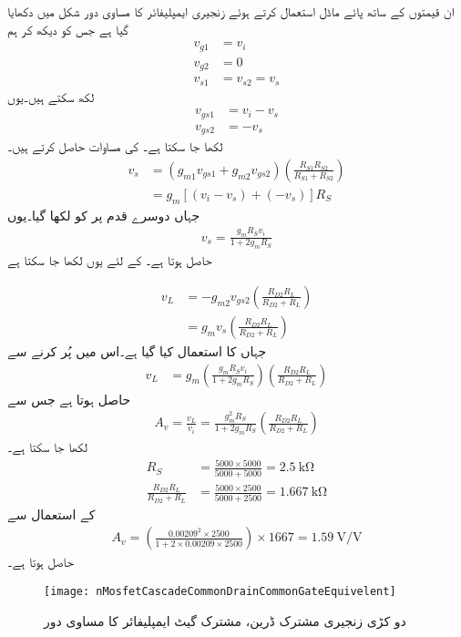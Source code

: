 ان قیمتوں کے ساتھ پائے ماڈل استعمال کرتے ہوئے زنجیری ایمپلیفائر کا مساوی دور شکل  میں دکھایا گیا ہے جس کو دیکھ کر ہم
\begin{align*}
v_{g1}&=v_i\\
v_{g2}&=0\\
v_{s1}&=v_{s2}=v_s
\end{align*}
لکھ سکتے ہیں۔یوں
\begin{align*}
v_{gs1}&=v_i-v_s\\
v_{gs2}&=-v_s
\end{align*}
لکھا جا سکتا ہے۔ کی مساوات حاصل کرتے ہیں۔
\begin{align*}
v_s &=\left(g_{m1} v_{gs1}+g_{m2} v_{gs2} \right) \left(\frac{R_{S1} R_{S2}}{R_{S1}+R_{S2}} \right)\\
&=g_m \left[\left(v_i-v_s \right)+\left(-v_s \right) \right] R_S
\end{align*}
جہاں دوسرے قدم پر  کو  لکھا گیا۔یوں
\begin{align*}
v_s=\frac{g_m R_S v_i}{1+2 g_m R_S}
\end{align*}
حاصل ہوتا ہے۔ کے لئے یوں لکھا جا سکتا ہے

\begin{align*}
v_L&=-g_{m2} v_{gs2} \left(\frac{R_{D2} R_L}{R_{D2}+R_L} \right)\\
&=g_m v_s \left(\frac{R_{D2} R_L}{R_{D2}+R_L} \right)
\end{align*}
جہاں  کا استعمال کیا گیا ہے۔اس میں  پُر کرنے سے
\begin{align*}
v_L&=g_m \left(\frac{g_m R_S v_i}{1+2 g_m R_S}\right) \left(\frac{R_{D2} R_L}{R_{D2}+R_L} \right)
\end{align*}
حاصل ہوتا ہے جس سے
\begin{align*}
A_v=\frac{v_L}{v_i}=\frac{g_m^2 R_S}{1+2 g_m R_S} \left(\frac{R_{D2} R_L}{R_{D2}+R_L} \right)
\end{align*}
لکھا جا سکتا ہے۔
\begin{align*}
R_S&=\frac{5000 \times 5000}{5000+5000}=\SI{2.5}{\kilo \ohm}\\
\frac{R_{D2} R_L}{R_{D2}+R_L}&=\frac{5000 \times 2500}{5000+2500}=\SI{1.667}{\kilo \ohm}
\end{align*}
کے استعمال سے
\begin{align*}
A_v=\left(\frac{0.00209^2 \times 2500}{1+2 \times 0.00209 \times 2500}\right)  \times 1667=\SI{1.59}{\volt \per \volt}
\end{align*}
حاصل ہوتا ہے۔
%
\begin{figure}
\centering
\texttt{[image: nMosfetCascadeCommonDrainCommonGateEquivelent]}
\caption{دو کڑی زنجیری مشترک ڈرین، مشترک گیٹ ایمپلیفائر کا مساوی دور}
\label{شکل_ماسفیٹ_زنجیری_مشترک_محاصل_مشترک_گیٹ_مساوی}
\end{figure}

